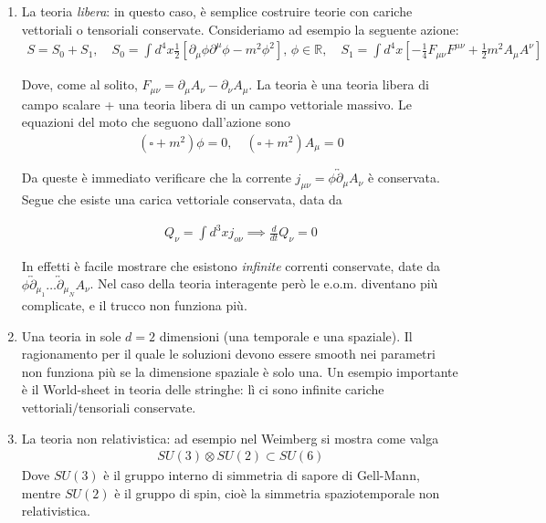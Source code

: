 \documentclass{report}
\begin{document}
\begin{enumerate}
    \item La teoria \emph{libera}: in questo caso, è semplice costruire teorie con cariche vettoriali o tensoriali conservate. Consideriamo ad esempio la seguente azione: 
    \begin{align}
        S = S_0 + S_1, \quad S_0 = \int d^4x \frac{1}{2}[\partial_\mu\phi\partial^\mu\phi -m^2\phi^2], \, \phi \in \mathbb{R}, \quad S_1 = \int d^4x \left[-\frac{1}{4}F_{\mu\nu}F^{\mu\nu} + \frac{1}{2}m^2 A_\mu A^\nu \right]
    \end{align}

    Dove, come al solito, \(F_{\mu\nu} = \partial_\mu A_\nu - \partial_\nu A_\mu\). La teoria è una teoria libera di campo scalare + una teoria libera di un campo vettoriale massivo. Le equazioni del moto che seguono dall'azione sono
    \begin{align}
        (\square +m^2)\phi = 0, \quad (\square +m^2)A_\mu = 0 
    \end{align}

    Da queste è immediato verificare che la corrente \(j_{\mu\nu} = \phi \overleftrightarrow{\partial}_\mu A_\nu\) è conservata. Segue che esiste una carica vettoriale conservata, data da 

    \begin{align}
        Q_\nu = \int d^3x j_{o\nu} \implies \frac{d}{dt}Q_\nu = 0 
    \end{align}

    In effetti è facile mostrare che esistono \emph{infinite} correnti conservate, date da \(\phi \overleftrightarrow{\partial}_{\mu_1} \ldots \overleftrightarrow{\partial}_{\mu_N}A_\nu\). Nel caso della teoria interagente però le e.o.m. diventano più complicate, e il trucco non funziona più. 
    \item Una teoria in sole \(d = 2\) dimensioni (una temporale e una spaziale). Il ragionamento per il quale le soluzioni devono essere smooth nei parametri non funziona più se la dimensione spaziale è solo una. Un esempio importante è il World-sheet in teoria delle stringhe: lì ci sono infinite cariche vettoriali/tensoriali conservate. 
    \item La teoria non relativistica: ad esempio nel Weimberg si mostra come valga 
    \begin{align}
        SU(3) \otimes SU(2) \subset SU(6)
    \end{align}
    Dove \(SU(3)\) è il gruppo interno di simmetria di sapore di Gell-Mann, mentre \(SU(2)\) è il gruppo di spin, cioè la simmetria spaziotemporale non relativistica. 
\end{enumerate}
\end{document}
